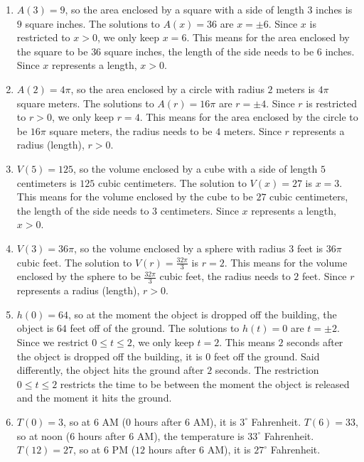 \begin{enumerate}
\setcounter{enumi}{\value{HW}}

\item  $A(3) = 9$, so the area enclosed by a square with a side of length $3$ inches is $9$ square inches.  The solutions to $A(x) = 36$ are $x = \pm 6$.  Since $x$ is restricted to  $x > 0$, we only keep $x = 6$.  This means for the area enclosed by the square to be $36$ square inches, the length of the side needs to be $6$ inches.  Since $x$ represents a length, $x > 0$.



\item  $A(2) = 4\pi$, so the area enclosed by a circle with radius $2$ meters is $4\pi$ square meters.  The solutions to $A(r) = 16\pi$ are $r = \pm 4$.  Since $r$ is restricted to $r > 0$, we only keep $r = 4$.  This means for the area enclosed by the circle to be $16\pi$ square meters, the radius needs to be $4$ meters.  Since $r$ represents a radius (length), $r > 0$.

\item  $V(5) = 125$, so the volume enclosed by a cube with a side of length $5$ centimeters is $125$ cubic centimeters.  The solution to $V(x) = 27$ is $x = 3$.  This means for the volume enclosed by the cube to be $27$ cubic centimeters, the length of the side needs to $3$ centimeters.  Since $x$ represents a length, $x > 0$.

\item  $V(3) = 36\pi$, so the volume enclosed by a sphere with radius $3$ feet is $36\pi$ cubic feet.  The solution to $V(r) = \frac{32\pi}{3}$ is $r = 2$.  This means for the volume enclosed by the sphere to be $\frac{32\pi}{3}$ cubic feet, the radius needs to $2$ feet.  Since $r$ represents a radius (length), $r > 0$.


\item $h(0) = 64$, so at the moment the object is dropped off the building, the object is $64$ feet off of the ground.  The solutions to $h(t) = 0$ are $t = \pm 2$.  Since we restrict $0 \leq t \leq 2$, we only keep $t = 2$.  This means $2$ seconds after the object is dropped off the building, it is $0$ feet off the ground.  Said differently, the object hits the ground after $2$ seconds.  The restriction  $0 \leq t \leq 2$ restricts the time to be between the moment the object is released and the moment it hits the ground.


\item  $T(0) = 3$, so at 6 AM ($0$ hours after 6 AM), it is $3^{\circ}$ Fahrenheit.  $T(6) = 33$, so at noon ($6$ hours after 6 AM), the temperature is $33^{\circ}$ Fahrenheit.  $T(12) = 27$, so at 6 PM ($12$ hours after 6 AM), it is $27^{\circ}$ Fahrenheit.



\end{enumerate}
